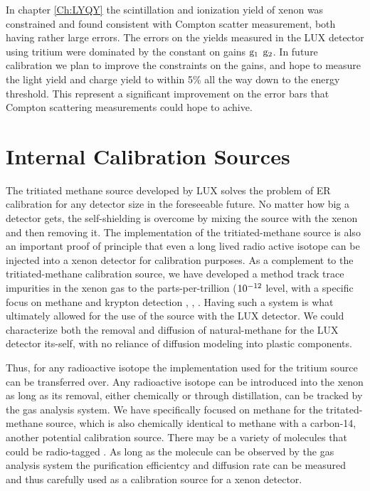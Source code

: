 In chapter \ref{Ch:LYQY} the scintillation and ionization yield of xenon was constrained and found consistent with Compton scatter measurement, both having rather large errors. The errors on the yields measured in the LUX detector using tritium were dominated by the constant on gains $\rm g_1$ $\rm g_2$. In future calibration we plan to improve the constraints on the gains, and hope to measure the light yield and charge yield to within 5\% all the way down to the energy threshold. This represent a significant improvement on the error bars that Compton scattering measurements could hope to achive. 

\section{Internal Calibration Sources}
The tritiated methane source developed by LUX solves the problem of ER calibration for any detector size in the foreseeable future. No matter how big a detector gets, the self-shielding is overcome by mixing the source with the xenon and then removing it. The implementation of the tritiated-methane source is also an important proof of principle that even a long lived radio active isotope can be injected into a xenon detector for calibration purposes. As a complement to the tritiated-methane calibration source, we have developed a method track trace impurities in the xenon gas to the parts-per-trillion ($\rm 10^{-12}$ level, with a specific focus on methane and krypton detection \cite{coldtrap}, \cite{Dobi_CH}, \cite{Kr_ppt_Dobi}. Having such a system is what ultimately allowed for the use of the source with the LUX detector. We could characterize both the removal and diffusion of natural-methane for the LUX detector its-self, with no reliance of diffusion modeling into plastic components. 

Thus, for any radioactive isotope the implementation used for the tritium source can be transferred over. Any radioactive isotope can be introduced into the xenon as long as its removal, either chemically or through distillation, can be tracked by the gas analysis system. We have specifically focused on methane for the tritated-methane source, which is also chemically identical to methane with a carbon-14, another potential calibration source. There may be a variety of molecules that could be radio-tagged . As long as the molecule can be observed by the gas analysis system the purification efficientcy and diffusion rate can be measured and thus carefully used as a calibration source for a xenon detector. 

